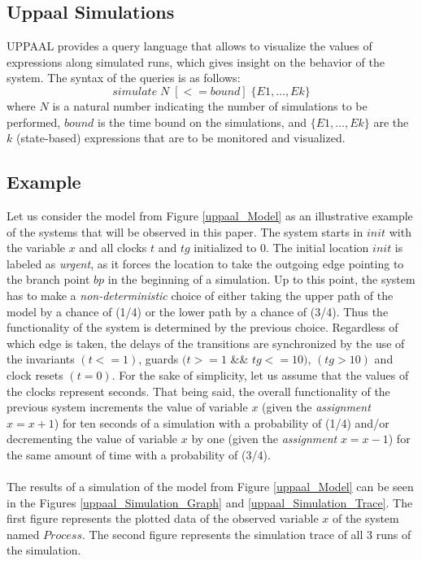 \subsection{Uppaal Simulations}
UPPAAL provides a query language that allows to visualize the values of expressions along simulated runs, which gives insight on the behavior of the system. The syntax of the queries is as follows: \cite{uppaalSmcTutorial}
\begin{equation}
	simulate \; N \; [<=bound] \; \{E1, \dots, Ek\}
\end{equation}
where $N$ is a natural number indicating the number of simulations to be performed, $bound$ is the time bound on the simulations, and $\{E1, \dots, Ek\}$ are the $k$ (state-based) expressions that are to be monitored and visualized.
%
\subsection{Example}
Let us consider the model from Figure \ref{uppaal_Model} as an illustrative example of the systems that will be observed in this paper. The system starts in $init$ with the variable $x$ and all clocks $t$ and $tg$ initialized to 0.
%
The initial location $init$ is labeled as \textit{urgent}, as it forces the location to take the outgoing edge pointing to the branch point $bp$ in the beginning of a simulation. 
%
Up to this point, the system has to make a \textit{non-deterministic} choice of either taking the upper path of the model by a chance of (1/4) or the lower path by a chance of (3/4). Thus the functionality of the system is determined by the previous choice. Regardless of which edge is taken, the delays of the transitions are synchronized by the use of the invariants $(t<=1)$, guards $(t>=1$ \&\& $tg<=10)$, $(tg>10)$ and clock resets $(t=0)$. For the sake of simplicity, let us assume that the values of the clocks represent seconds. That being said, the overall functionality of the previous system increments the value of variable $x$ (given the \textit{assignment} $x=x+1$) for ten seconds of a simulation with a probability of (1/4) and/or decrementing the value of variable $x$ by one (given the \textit{assignment} $x=x-1$) for the same amount of time with a probability of (3/4).
\\ \\
The results of a simulation of the model from Figure \ref{uppaal_Model} can be seen in the Figures \ref{uppaal_Simulation_Graph} and \ref{uppaal_Simulation_Trace}. The first figure represents the plotted data of the observed variable $x$ of the system named $Process$. The second figure represents the simulation trace of all 3 runs of the simulation. 

